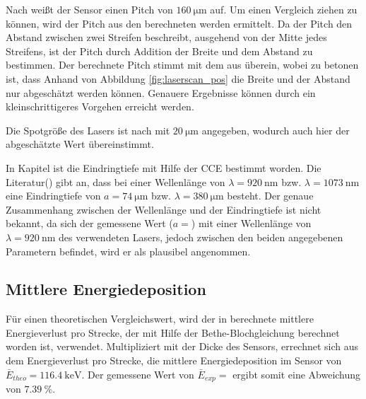 Nach \cite{skript} weißt der Sensor einen Pitch von $\SI{160}{\micro\meter}$ auf. Um einen Vergleich ziehen zu können, wird der Pitch aus den berechneten werden ermittelt. Da der Pitch den Abstand zwischen zwei Streifen beschreibt, ausgehend von der Mitte jedes Streifens, ist der Pitch durch Addition der Breite und dem Abstand zu bestimmen. Der berechnete Pitch stimmt mit dem aus \cite{skript} überein, wobei zu betonen ist, dass Anhand von Abbildung \ref{fig:laserscan_pos} die Breite und der Abstand nur abgeschätzt werden können. Genauere Ergebnisse können durch ein kleinschrittigeres Vorgehen erreicht werden.

Die Spotgröße des Lasers ist nach \cite{skript} mit $\SI{20}{\micro\meter}$ angegeben, wodurch auch hier der abgeschätzte Wert übereinstimmt.

In Kapitel \label{sec:CCE} ist die Eindringtiefe mit Hilfe der CCE bestimmt worden. Die Literatur(\cite{skript}) gibt an, dass bei einer Wellenlänge von $\lambda=\SI{920}{\nano\meter}$ bzw. $\lambda=\SI{1073}{\nano\meter}$ eine Eindringtiefe von $a=\SI{74}{\micro\meter}$ bzw. $\lambda=\SI{380}{\micro\meter}$ besteht. Der genaue Zusammenhang zwischen der Wellenlänge und der Eindringtiefe ist nicht bekannt,  da sich der gemessene Wert ($a= $) mit einer Wellenlänge von $\lambda=\SI{920}{\nano\meter}$ des verwendeten Lasers, jedoch zwischen den beiden angegebenen Parametern befindet, wird er als plausibel angenommen.


\subsection{Mittlere Energiedeposition}
Für einen theoretischen Vergleichswert, wird der in \cite{skript} berechnete mittlere Energieverlust pro Strecke, der mit Hilfe der Bethe-Blochgleichung berechnet worden ist, verwendet. Multipliziert mit der Dicke des Sensors, errechnet sich aus dem Energieverlust pro Strecke, die mittlere Energiedeposition im Sensor von $\bar{E}_{theo}=\SI{116.4}{\kilo\eV}$. Der gemessene Wert von $\bar{E}_{exp}= $ ergibt somit eine Abweichung von $\SI{7.39}{\percent}$.
